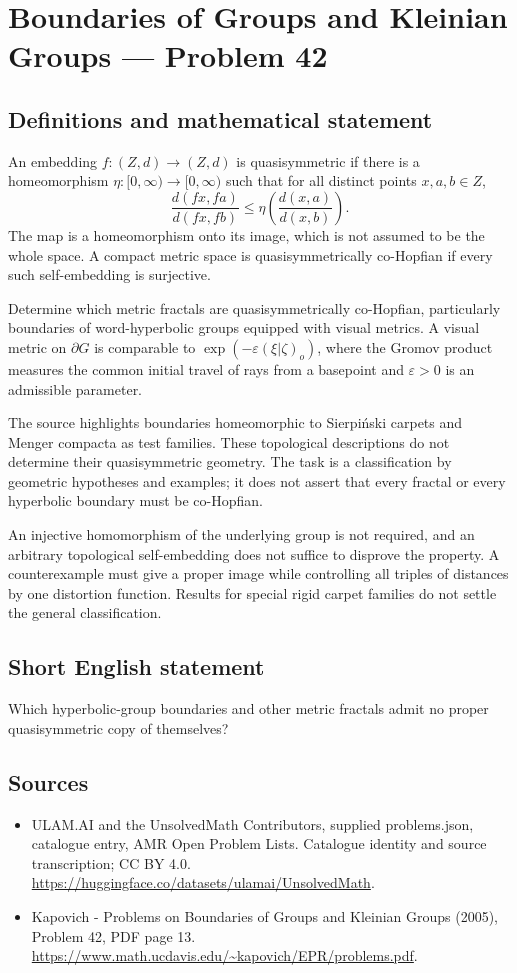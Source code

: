 \documentclass[11pt,a4paper]{article}
\begin{document}
\section*{Boundaries of Groups and Kleinian Groups — Problem 42}\label{statement}

\subsection{Definitions and mathematical statement}
An embedding $f:(Z,d)\to(Z,d)$ is quasisymmetric if there is a homeomorphism $\eta:[0,\infty)\to[0,\infty)$ such that for all distinct points $x,a,b\in Z$,
\[
 \frac{d(fx,fa)}{d(fx,fb)}
       \leq\eta\!\left(\frac{d(x,a)}{d(x,b)}\right).
\]
The map is a homeomorphism onto its image, which is not assumed to be the whole space. A compact metric space is quasisymmetrically co-Hopfian if every such self-embedding is surjective.

Determine which metric fractals are quasisymmetrically co-Hopfian, particularly boundaries of word-hyperbolic groups equipped with visual metrics. A visual metric on $\partial G$ is comparable to $\exp(-\varepsilon(\xi|\zeta)_o)$, where the Gromov product measures the common initial travel of rays from a basepoint and $\varepsilon>0$ is an admissible parameter.

The source highlights boundaries homeomorphic to Sierpi\'nski carpets and Menger compacta as test families. These topological descriptions do not determine their quasisymmetric geometry. The task is a classification by geometric hypotheses and examples; it does not assert that every fractal or every hyperbolic boundary must be co-Hopfian.

An injective homomorphism of the underlying group is not required, and an arbitrary topological self-embedding does not suffice to disprove the property. A counterexample must give a proper image while controlling all triples of distances by one distortion function. Results for special rigid carpet families do not settle the general classification.
\subsection{Short English statement}
Which hyperbolic-group boundaries and other metric fractals admit no proper quasisymmetric copy of themselves?
\subsection{Sources}
\begin{itemize}
\item[S1] ULAM.AI and the UnsolvedMath Contributors, supplied problems.json, catalogue entry, AMR Open Problem Lists. Catalogue identity and source transcription; CC BY 4.0.
\url{https://huggingface.co/datasets/ulamai/UnsolvedMath}.
\item[S2] Kapovich - Problems on Boundaries of Groups and Kleinian Groups (2005), Problem 42, PDF page 13. 
\url{https://www.math.ucdavis.edu/~kapovich/EPR/problems.pdf}.
\end{itemize}
\end{document}
